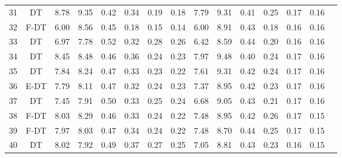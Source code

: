 \begin{longtable}{@{\hskip3pt}c@{\hskip3pt}c@{\hskip3pt}c@{\hskip3pt}c@{\hskip3pt}c@{\hskip3pt}c@{\hskip3pt}c@{\hskip3pt}c@{\hskip3pt}c@{\hskip3pt}c@{\hskip3pt}c@{\hskip3pt}c@{\hskip3pt}c@{\hskip3pt}c@{\hskip3pt}c}
         31 &             DT &              8.78 &        9.35 &          0.42 &        0.34 &        0.19 &         0.18 &                7.79 &        9.31 &          0.41 &        0.25 &        0.17 &         0.16 \\
         32 &           F-DT &              6.00 &        8.56 &          0.45 &        0.18 &        0.15 &         0.14 &                6.00 &        8.91 &          0.43 &        0.18 &        0.16 &         0.16 \\
         33 &             DT &              6.97 &        7.78 &          0.52 &        0.32 &        0.28 &         0.26 &                6.42 &        8.59 &          0.44 &        0.20 &        0.16 &         0.16 \\
         34 &             DT &              8.45 &        8.48 &          0.46 &        0.36 &        0.24 &         0.23 &                7.97 &        9.48 &          0.40 &        0.24 &        0.17 &         0.16 \\
         35 &             DT &              7.84 &        8.24 &          0.47 &        0.33 &        0.23 &         0.22 &                7.61 &        9.31 &          0.42 &        0.24 &        0.17 &         0.16 \\
         36 &           E-DT &              7.79 &        8.11 &          0.47 &        0.32 &        0.24 &         0.23 &                7.37 &        8.95 &          0.42 &        0.23 &        0.17 &         0.16 \\
         37 &             DT &              7.45 &        7.91 &          0.50 &        0.33 &        0.25 &         0.24 &                6.68 &        9.05 &          0.43 &        0.21 &        0.17 &         0.16 \\
         38 &           F-DT &              8.03 &        8.29 &          0.46 &        0.33 &        0.24 &         0.22 &                7.48 &        8.95 &          0.42 &        0.26 &        0.17 &         0.15 \\
         39 &           F-DT &              7.97 &        8.03 &          0.47 &        0.34 &        0.24 &         0.22 &                7.48 &        8.70 &          0.44 &        0.25 &        0.17 &         0.15 \\
         40 &             DT &              8.02 &        7.92 &          0.49 &        0.37 &        0.27 &         0.25 &                7.05 &        8.81 &          0.43 &        0.23 &        0.16 &         0.15 \\

\end{longtable}
